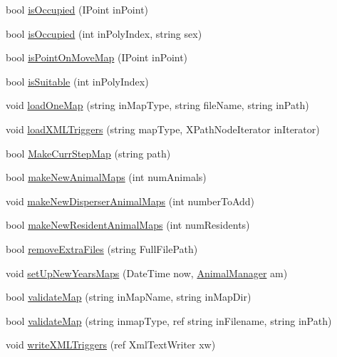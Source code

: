 \begin{DoxyCompactItemize}
\item 
bool \hyperlink{class_s_e_a_r_c_h_1_1_map_manager_ac0d64f579f0cb29919df65e637c2ad91}{is\-Occupied} (I\-Point in\-Point)
\item 
bool \hyperlink{class_s_e_a_r_c_h_1_1_map_manager_afc63aa261754cb5b5c6cfc470fc785bc}{is\-Occupied} (int in\-Poly\-Index, string sex)
\item 
bool \hyperlink{class_s_e_a_r_c_h_1_1_map_manager_a3d0e5b1847f8f17e77654f367a0400fe}{is\-Point\-On\-Move\-Map} (I\-Point in\-Point)
\item 
bool \hyperlink{class_s_e_a_r_c_h_1_1_map_manager_a07e3d6b4de232fac7769058cc5f99e31}{is\-Suitable} (int in\-Poly\-Index)
\item 
void \hyperlink{class_s_e_a_r_c_h_1_1_map_manager_a9765a7f3647d751e551d3b7d6e250268}{load\-One\-Map} (string in\-Map\-Type, string file\-Name, string in\-Path)
\item 
void \hyperlink{class_s_e_a_r_c_h_1_1_map_manager_ac67339a2c958ed0848b30b410c24f86a}{load\-X\-M\-L\-Triggers} (string map\-Type, X\-Path\-Node\-Iterator in\-Iterator)
\item 
bool \hyperlink{class_s_e_a_r_c_h_1_1_map_manager_a808700f9d719ed7245766bbe60f00e5d}{Make\-Curr\-Step\-Map} (string path)
\item 
bool \hyperlink{class_s_e_a_r_c_h_1_1_map_manager_a805b6e83935f512007b5a11b2c26bbf5}{make\-New\-Animal\-Maps} (int num\-Animals)
\item 
void \hyperlink{class_s_e_a_r_c_h_1_1_map_manager_a97fedebfae4f345d08a07c5053c8bbc2}{make\-New\-Disperser\-Animal\-Maps} (int number\-To\-Add)
\item 
bool \hyperlink{class_s_e_a_r_c_h_1_1_map_manager_af28f0c7fe4899b94c572304592fc4ee5}{make\-New\-Resident\-Animal\-Maps} (int num\-Residents)
\item 
bool \hyperlink{class_s_e_a_r_c_h_1_1_map_manager_a890c404b5171da409273259a39bf6a54}{remove\-Extra\-Files} (string Full\-File\-Path)
\item 
void \hyperlink{class_s_e_a_r_c_h_1_1_map_manager_a559a073178df190bf95274b6734c8b19}{set\-Up\-New\-Years\-Maps} (Date\-Time now, \hyperlink{class_s_e_a_r_c_h_1_1_animal_manager}{Animal\-Manager} am)
\item 
bool \hyperlink{class_s_e_a_r_c_h_1_1_map_manager_a24987277ca8a2d9d54d7ed96d1faf9e5}{validate\-Map} (string in\-Map\-Name, string in\-Map\-Dir)
\item 
bool \hyperlink{class_s_e_a_r_c_h_1_1_map_manager_a3fa771a4035ff2c907639e23ef3dd9f4}{validate\-Map} (string inmap\-Type, ref string in\-Filename, string in\-Path)
\item 
void \hyperlink{class_s_e_a_r_c_h_1_1_map_manager_afb2bb5b4a4f395c1ad61d65b247f27e9}{write\-X\-M\-L\-Triggers} (ref Xml\-Text\-Writer xw)
\end{DoxyCompactItemize}

